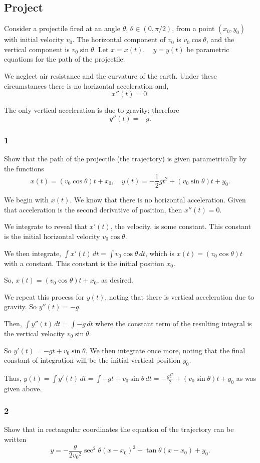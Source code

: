 \documentclass[../hw10]{subfiles}
\begin{document}
\subsection*{Project}
Consider a projectile fired at an angle $\theta$, $\theta \in (0,\pi/2)$, from a point $(x_0, y_0)$ with initial velocity $v_0$. 
The horizontal component of $v_0$ is $v_0\cos{\theta}$, and the vertical component is $v_0\sin{\theta}$.
Let $x=x(t), \quad y=y(t)$ be parametric equations for the path of the projectile.

We neglect air resistance and the curvature of the earth. Under these circumstances there is no horizontal acceleration and, \[x''(t)=0.\]

The only vertical acceleration is due to gravity; therefore \[y''(t)=-g.\]

\subsubsection*{1}
Show that the path of the projectile (the trajectory) is given parametrically by the functions
\[x(t)=(v_0\cos{\theta})t+x_0, \quad y(t) = -\frac{1}{2}gt^2+(v_0\sin{\theta})t+y_0.\]

We begin with $x(t)$. We know that there is no horizontal acceleration. Given that acceleration is the second derivative of position, then $x''(t)=0$.

We integrate to reveal that $x'(t)$, the velocity, is some constant. This constant is the initial horizontal velocity $v_0\cos{\theta}$.

We then integrate, $\int x'(t)\,dt = \int v_0\cos{\theta}\,dt$, which is $x(t)=(v_0\cos{\theta})t$ with a constant. This constant is the initial position $x_0$.

So, $x(t)=(v_0\cos{\theta})t+x_0$, as desired.

We repeat this process for $y(t)$, noting that there is vertical acceleration due to gravity. So $y''(t)=-g$.

Then, $\int y''(t)\,dt = \int -g\, dt$ where the constant term of the resulting integral is the vertical velocity $v_0\sin{\theta}$.

So $y'(t)=-gt+v_0\sin{\theta}$. We then integrate once more, noting that the final constant of integration will be the initial vertical position $y_0$.

Thus, $y(t)=\int y'(t)\,dt = \int -gt+v_0\sin{\theta} \, dt = -\frac{gt^2}{2}+(v_0\sin{\theta})t+y_0$ as was given above.

\subsubsection*{2}
Show that in rectangular coordinates the equation of the trajectory can be written
\[y=-\frac{g}{2{v_0}^2}\sec^2{\theta}{(x-x_0)}^2+\tan{\theta}(x-x_0)+y_0.\]
\end{document}
